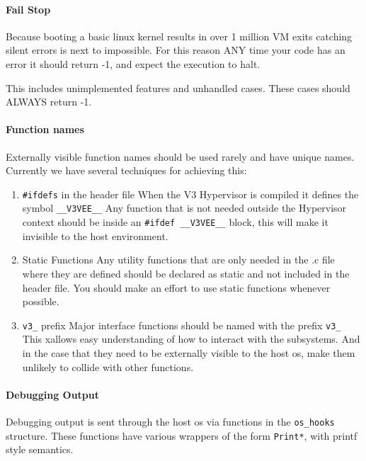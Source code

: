 \documentclass[11pt]{article}
\begin{document}
\paragraph*{Fail Stop}
Because booting a basic linux kernel results in over 1 million VM exits
catching silent errors is next to impossible. For this reason
ANY time your code has an error it should return -1, and expect the
execution to halt. 

This includes unimplemented features and unhandled cases. These cases
should ALWAYS return -1. 


\paragraph*{Function names}
Externally visible function names should be used rarely and have
unique names. Currently we have several techniques for achieving this:

\begin{enumerate}
\item \verb.#ifdefs. in the header file
\newline
When the V3 Hypervisor is compiled it defines the symbol
\verb.__V3VEE__. Any function that is not needed outside the Hypervisor
context should be inside an \verb.#ifdef __V3VEE__. block, this will make it
invisible to the host environment.

\item Static Functions
\newline
Any utility functions that are only needed in the .c file where they
are defined should be declared as static and not included in the
header file. You should make an effort to use static functions
whenever possible. 

\item \verb.v3_. prefix
\newline
Major interface functions should be named with the prefix \verb.v3_. This
xallows easy understanding of how to interact with the subsystems. And
in the case that they need to be externally visible to the host os,
make them unlikely to collide with other functions. 
\end{enumerate}

\paragraph*{Debugging Output}
Debugging output is sent through the host os via functions in the
\verb.os_hooks. structure. These functions have various wrappers of the form
\verb.Print*., with printf style semantics. 
\end{document}
